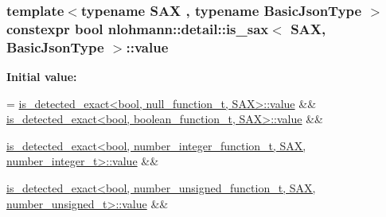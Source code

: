 \subsubsection[{\texorpdfstring{value}{value}}]{\setlength{\rightskip}{0pt plus 5cm}template$<$typename S\+AX , typename Basic\+Json\+Type $>$ constexpr bool {\bf nlohmann\+::detail\+::is\+\_\+sax}$<$ S\+AX, Basic\+Json\+Type $>$\+::value\hspace{0.3cm}{\ttfamily [static]}}\hypertarget{structnlohmann_1_1detail_1_1is__sax_a8ab7e51087000e948b4a2492257484dc}{}\label{structnlohmann_1_1detail_1_1is__sax_a8ab7e51087000e948b4a2492257484dc}
{\bfseries Initial value\+:}
\begin{DoxyCode}
=
        \hyperlink{namespacenlohmann_1_1detail_a2fb6dae6578e06ae73ca0d7cc8512b1aa2063c1608d6e0baf80249c42e2be5804}{is\_detected\_exact<bool, null\_function\_t, SAX>::value}
       &&
        \hyperlink{namespacenlohmann_1_1detail_a2fb6dae6578e06ae73ca0d7cc8512b1aa2063c1608d6e0baf80249c42e2be5804}{is\_detected\_exact<bool, boolean\_function\_t, SAX>::value}
       &&
        
      \hyperlink{namespacenlohmann_1_1detail_a2fb6dae6578e06ae73ca0d7cc8512b1aa2063c1608d6e0baf80249c42e2be5804}{is\_detected\_exact<bool, number\_integer\_function\_t, SAX, number\_integer\_t>::value}
       &&
        
      \hyperlink{namespacenlohmann_1_1detail_a2fb6dae6578e06ae73ca0d7cc8512b1aa2063c1608d6e0baf80249c42e2be5804}{is\_detected\_exact<bool, number\_unsigned\_function\_t, SAX, number\_unsigned\_t>::value}
       &&
        

\end{DoxyCode}
